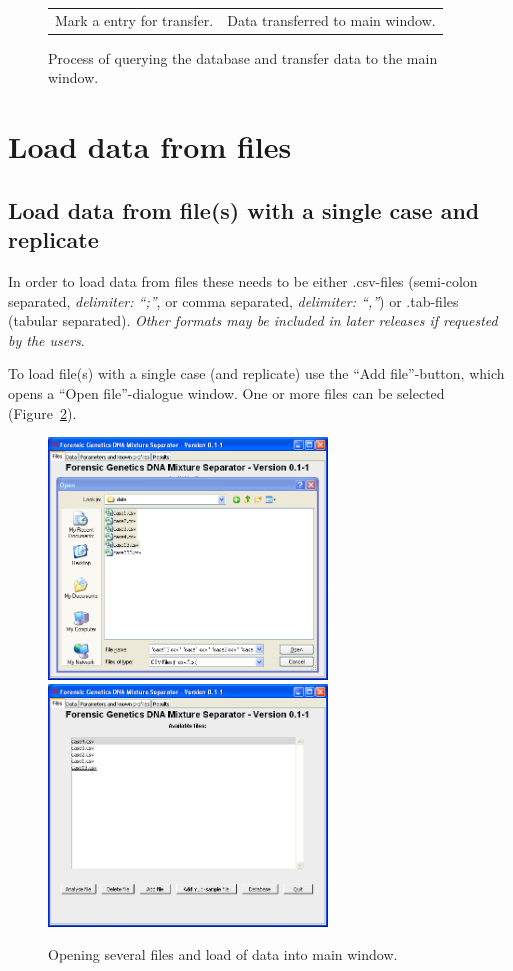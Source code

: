 \documentclass[a4paper,11pt]{article}
\begin{document}
\begin{figure}[!h]
\begin{tabular}{cc}
    Mark a entry for transfer. & Data transferred to main window.\\
  \end{tabular}
  \caption{\label{fig:database_query}Process of querying the database
    and transfer data to the main window.}
\end{figure}

\section{Load data from files}
\label{sec:files}

\subsection{Load data from file(s) with a single case and replicate}
\label{sec:singlefile}

In order to load data from files these needs to be either .csv-files
(semi-colon separated, \textsl{delimiter: ``;''}, or comma separated,
\textsl{delimiter: ``,''}) or .tab-files (tabular
separated). \textsl{Other formats may be included in later releases if
  requested by the users}.

To load file(s) with a single case (and replicate) use the ``Add
file''-button, which opens a ``Open file''-dialogue window. One or
more files can be selected (Figure~\ref{fig:files}).

\begin{figure}[!h]
  \centering
  \includegraphics[width=7.4cm]{files_load_multiple_files}
  \quad
  \includegraphics[width=7.4cm]{files_multiple_files}
  \caption{\label{fig:files}Opening several files
    and load of data into main window.}
\end{figure}
\end{document}
